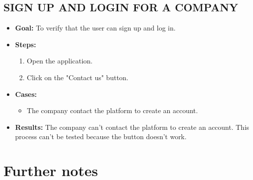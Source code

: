 \subsection{SIGN UP AND LOGIN FOR A COMPANY}\label{subsec:sign-up-and-login-for-a-company}
\begin{itemize}
    \item \textbf{Goal:} To verify that the user can sign up and log in.

    \item \textbf{Steps:}
    \begin{enumerate}
        \item Open the application.
        \item Click on the "Contact us" button.
    \end{enumerate}
    \item \textbf{Cases:}
    \begin{itemize}
        \item The company contact the platform to create an account.
    \end{itemize}
    \item \textbf{Results:} The company can't contact the platform to create an account.
    This process can't be tested because the button doesn't work.
\end{itemize}




\section{Further notes}\label{sec:further-notes}